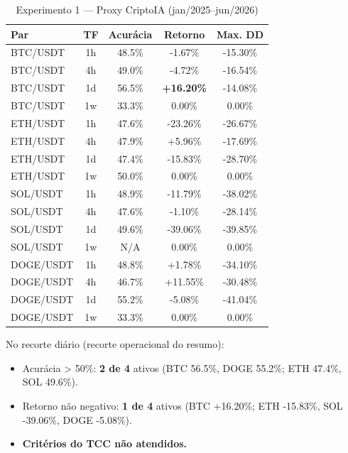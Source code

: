 \documentclass[conference]{IEEEtran}
\begin{document}
\begin{table}[t]
  \centering
  \caption{Experimento 1 — Proxy CriptoIA (jan/2025–jun/2026)}
  \label{tab:exp1_grade}
  \small
  \begin{tabular}{lcccc}
    \toprule
    Par & TF & Acurácia & Retorno & Max. DD \\
    \midrule
    BTC/USDT & 1h & 48.5\% & -1.67\%  & -15.30\% \\
    BTC/USDT & 4h & 49.0\% & -4.72\%  & -16.54\% \\
    BTC/USDT & 1d & 56.5\% & \textbf{+16.20\%} & -14.08\% \\
    BTC/USDT & 1w & 33.3\% & 0.00\%   & 0.00\%   \\
    ETH/USDT & 1h & 47.6\% & -23.26\% & -26.67\% \\
    ETH/USDT & 4h & 47.9\% & +5.96\%  & -17.69\% \\
    ETH/USDT & 1d & 47.4\% & -15.83\% & -28.70\% \\
    ETH/USDT & 1w & 50.0\% & 0.00\%   & 0.00\%   \\
    SOL/USDT & 1h & 48.9\% & -11.79\% & -38.02\% \\
    SOL/USDT & 4h & 47.6\% & -1.10\%  & -28.14\% \\
    SOL/USDT & 1d & 49.6\% & -39.06\% & -39.85\% \\
    SOL/USDT & 1w & N/A    & 0.00\%   & 0.00\%   \\
    DOGE/USDT& 1h & 48.8\% & +1.78\%  & -34.10\% \\
    DOGE/USDT& 4h & 46.7\% & +11.55\% & -30.48\% \\
    DOGE/USDT& 1d & 55.2\% & -5.08\%  & -41.04\% \\
    DOGE/USDT& 1w & 33.3\% & 0.00\%   & 0.00\%   \\
    \bottomrule
  \end{tabular}
\end{table}

No recorte diário (recorte operacional do resumo):

\begin{itemize}
  \item Acurácia > 50\%: \textbf{2 de 4} ativos (BTC 56.5\%, DOGE 55.2\%; ETH 47.4\%, SOL 49.6\%).
  \item Retorno não negativo: \textbf{1 de 4} ativos (BTC +16.20\%; ETH -15.83\%, SOL -39.06\%, DOGE -5.08\%).
  \item \textbf{Critérios do TCC não atendidos.}
\end{itemize}
\end{document}
